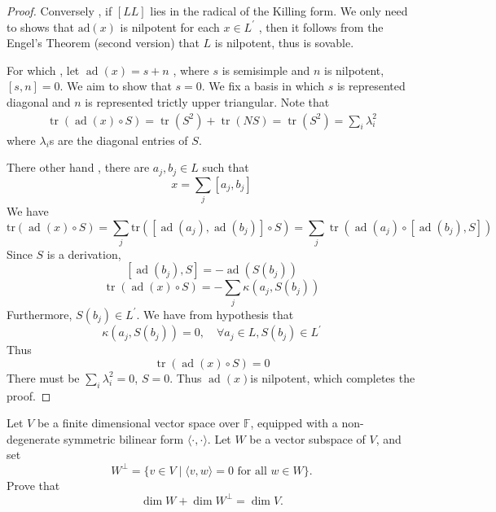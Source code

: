 \documentclass[../main.tex]{subfiles}
\begin{document}
\begin{proof}
Conversely , if \(  \left[ LL \right]   \) lies in the radical of the Killing form. We only need to shows that \(  \mathrm{ad}\left( x \right)   \) is nilpotent for each \(  x\in L^{\prime}   \)          , then it follows from the Engel's Theorem (second version) that \(  L  \) is nilpotent, thus is sovable. 

For which , let \(  \operatorname{ad}\left( x \right)= s+ n   \) , where \(  s  \) is semisimple and \(  n  \) is nilpotent, \(  \left[ s,n \right]= 0   \). We aim to show that \(  s= 0  \).  
We fix a basis in which \(  s  \) is represented diagonal and \(  n  \) is represented trictly upper triangular. Note that   
\[
\begin{aligned}
\operatorname{tr}\left( \operatorname{ad}\left( x \right)\circ S  \right)= \operatorname{tr}\left( S^{2} \right)+ \operatorname{tr}\left( NS \right)= \operatorname{tr}\left( S^{2} \right)     = \sum _{i} \lambda _{i}^{2}
\end{aligned}
\]where \(   \lambda _{i}  \)s are the diagonal entries of \(  S  \).  

There other hand , there are \(  a_{j},b_{j} \in L  \) such that \[
x= \sum _{j}\left[ a_{j},b_{j} \right] 
\] We have \[
\mathrm{tr}\left( \operatorname{ad}\left( x \right)  \circ S\right)= \sum _{j}\mathrm{tr}\left( \left[ \operatorname{ad}\left( a_{j} \right), \operatorname{ad}\left( b_{j} \right)   \right]\circ S  \right)  = \sum _{j}\operatorname{tr}\left( \operatorname{ad}\left( a_{j} \right)\circ \left[ \operatorname{ad}\left( b_{j} \right),S  \right]   \right) 
\] Since \(  S  \) is a derivation, \[
\left[ \operatorname{ad}\left( b_{j} \right),S  \right]= - \operatorname{ad}\left( S\left( b_{j} \right)  \right)  
\]  \[
\operatorname{tr}\left( \operatorname{ad}\left( x \right)\circ S  \right)= -\sum _{j} \kappa \left( a_{j},S\left( b_{j} \right)  \right)  
\]Furthermore, \(  S\left( b_{j} \right)\in L^{\prime}    \). We have from hypothesis that \[
 \kappa \left( a_{j},S\left( b_{j} \right)  \right)= 0,\quad \forall a_{j}\in L, S\left( b_{j} \right)\in L^{\prime}   
\]Thus \[
\operatorname{tr}\left( \operatorname{ad}\left( x \right)\circ S  \right)= 0 
\] There must be \(  \sum _{i} \lambda _{i}^{2}= 0  \), \(  S= 0  \). Thus \(  \operatorname{ad}\left( x \right)   \)is nilpotent, which completes the proof.
\end{proof}
\begin{exercise}{}{}
Let $V$ be a finite dimensional vector space over $\mathbb{F}$, equipped with a non-degenerate symmetric bilinear form $\langle \cdot, \cdot \rangle$. Let $W$ be a vector subspace of $V$, and set
\[
W^{\perp} = \{v \in V \mid \langle v, w \rangle = 0 \text{ for all } w \in W\}.
\]
Prove that
\[
\dim W + \dim W^{\perp} = \dim V.
\]
\end{exercise}
\end{document}
